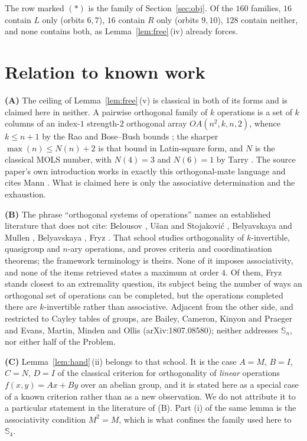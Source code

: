 \documentclass[11pt]{amsart}
\theoremstyle{remark}
\theoremstyle{definition}
\newcommand{\Sops}{\mathbb S}
\newcommand{\Nmols}{N}
\begin{document}
\noindent The row marked $(\ast)$ is the family of Section~\ref{sec:obj}. Of the $160$ families, $16$
contain $L$ only (orbits $6,7$), $16$ contain $R$ only (orbits $9,10$), $128$ contain neither, and
none contains both, as Lemma~\ref{lem:free}\,(iv) already forces.

\section{Relation to known work}\label{sec:attr}

\noindent\textbf{(A)} The ceiling of Lemma~\ref{lem:free}\,(v) is classical in both of its forms and
is claimed here in neither. A pairwise orthogonal family of $k$ operations is a set of $k$ columns
of an index-$1$ strength-$2$ orthogonal array $OA(n^2,k,n,2)$, whence $k\le n+1$ by the Rao and
Bose--Bush bounds \cite{Rao,BoseBush}; the sharper $\max(n)\le\Nmols(n)+2$ is that bound in
Latin-square form, and $\Nmols$ is the classical MOLS number, with $\Nmols(4)=3$ and
$\Nmols(6)=1$ by Tarry \cite{Tarry}. The source paper's own introduction works in exactly this
orthogonal-mate language and cites Mann \cite{Mann1,Mann2}. What is claimed here is only the
associative determination and the exhaustion.

\medskip
\noindent\textbf{(B)} The phrase ``orthogonal systems of operations'' names an established
literature that \cite{ABCHK} does not cite: Belousov \cite{Belousov}, U\v{s}an and Stojakovi\'c
\cite{UsanStojakovic}, Belyavskaya and Mullen \cite{BelyavskayaMullen}, Belyavskaya
\cite{Belyavskaya2005}, Fryz \cite{Fryz2018}. That school studies orthogonality of $k$-invertible,
quasigroup and $n$-ary operations, and proves criteria and coordinatisation theorems; the framework
terminology is theirs. None of it imposes associativity, and none of the items retrieved states a
maximum at order $4$. Of them, Fryz \cite{Fryz2018} stands closest to an extremality question, its
subject being the number of ways an orthogonal set of operations can be completed, but the operations
completed there are $k$-invertible rather than associative. Adjacent from the other side, and
restricted to Cayley tables of groups, are Bailey, Cameron, Kinyon and Praeger \cite{BCKP} and Evans,
Martin, Minden and Ollis (arXiv:1807.08580); neither addresses $\Sops_n$, nor either half of the
Problem.

\medskip
\noindent\textbf{(C)} Lemma~\ref{lem:hand}\,(ii) belongs to that school. It is the case
$A=M$, $B=I$, $C=N$, $D=I$ of the classical criterion for orthogonality of \emph{linear} operations
$f(x,y)=Ax+By$ over an abelian group, and it is stated here as a special case of a known criterion
rather than as a new observation. We do not attribute it to a particular statement in the literature
of (B). Part (i) of the same lemma is the
associativity condition $M^2=M$, which is what confines the family used here to $\Sops_4$.
\end{document}

